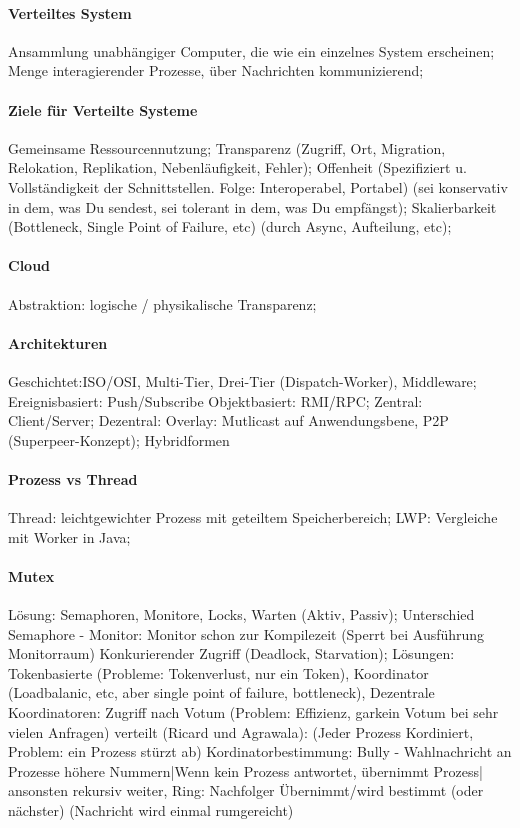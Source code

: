 \documentclass[pagesize,11pt,a4paper]{scrartcl}
\begin{document}
\paragraph*{Verteiltes System}
	Ansammlung unabhängiger Computer, die wie ein einzelnes System erscheinen; 
	Menge interagierender Prozesse, über Nachrichten kommunizierend;

\paragraph*{Ziele für Verteilte Systeme}
	Gemeinsame Ressourcennutzung;
	Transparenz (Zugriff, Ort, Migration, Relokation, Replikation, Nebenläufigkeit, Fehler);
	Offenheit (Spezifiziert u. Vollständigkeit der Schnittstellen. Folge: Interoperabel, Portabel) (sei konservativ in dem, was Du sendest, sei tolerant in dem, was Du empfängst);
	Skalierbarkeit (Bottleneck, Single Point of Failure, etc) (durch Async, Aufteilung, etc);
	
\paragraph*{Cloud}
	Abstraktion: logische / physikalische Transparenz; 

\paragraph*{Architekturen}
	Geschichtet:ISO/OSI, Multi-Tier, Drei-Tier (Dispatch-Worker), Middleware;
	Ereignisbasiert: Push/Subscribe
	Objektbasiert: RMI/RPC;
	Zentral: Client/Server;
	Dezentral: Overlay: Mutlicast auf Anwendungsbene, P2P (Superpeer-Konzept);
	Hybridformen
	
\paragraph*{Prozess vs Thread}
	Thread: leichtgewichter Prozess mit geteiltem Speicherbereich;
	LWP: Vergleiche mit Worker in Java;

\paragraph*{Mutex}
	Lösung: Semaphoren, Monitore, Locks, Warten (Aktiv, Passiv);
	Unterschied Semaphore - Monitor: Monitor schon zur Kompilezeit (Sperrt bei Ausführung Monitorraum)
	Konkurierender Zugriff (Deadlock, Starvation);
	Lösungen: 
		Tokenbasierte (Probleme: Tokenverlust, nur ein Token), 
		Koordinator (Loadbalanic, etc, aber single point of failure, bottleneck),
		Dezentrale Koordinatoren: Zugriff nach Votum (Problem: Effizienz, garkein Votum bei sehr vielen Anfragen)
		verteilt (Ricard und Agrawala): (Jeder Prozess Kordiniert, Problem: ein Prozess stürzt ab)  
 		Kordinatorbestimmung: 
			Bully - Wahlnachricht an Prozesse höhere Nummern|Wenn kein Prozess antwortet, übernimmt Prozess| ansonsten rekursiv weiter,
			Ring: Nachfolger Übernimmt/wird bestimmt (oder nächster) (Nachricht wird einmal rumgereicht)
\end{document}
